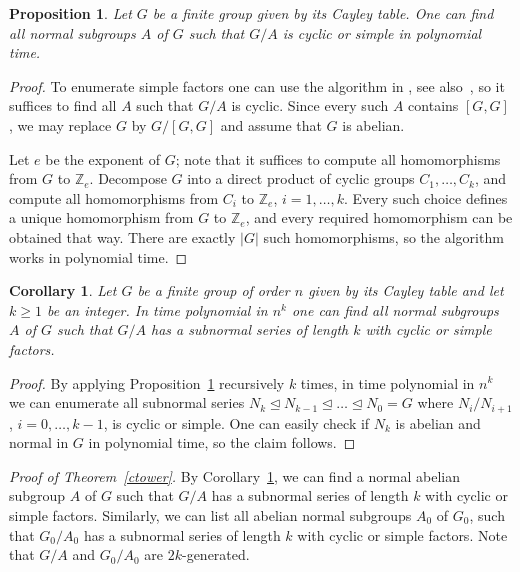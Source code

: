 \documentclass{article}
\newtheorem{proposition}[theorem]{Proposition}
\newtheorem{corollary}[theorem]{Corollary}
\begin{document}
\begin{proposition}\label{findcf}
	Let \( G \) be a finite group given by its Cayley table.
	One can find all normal subgroups \( A \) of \( G \) such that \( G/A \) is cyclic or simple in polynomial time.
\end{proposition}
\begin{proof}
	To enumerate simple factors one can use the algorithm in \cite[Lemma~7.4]{babainc},
	see also~\cite[Section~3.1~(o) and (p)]{seress}, so it suffices to find all \( A \)
	such that \( G/A \) is cyclic. Since every such \( A \) contains \( [G, G] \), we may replace \( G \) by \( G/[G, G] \) and assume that \( G \) is abelian.

	Let \( e \) be the exponent of \( G \); note that it suffices to compute all homomorphisms from \( G \) to \( \mathbb{Z}_e \).
	Decompose \( G \) into a direct product of cyclic groups \( C_1, \dots, C_k \), and compute all homomorphisms
	from \( C_i \) to \( \mathbb{Z}_e \), \( i = 1, \dots, k \). Every such choice defines a unique homomorphism from \( G \) to \( \mathbb{Z}_e \),
	and every required homomorphism can be obtained that way.
	There are exactly \( |G| \) such homomorphisms, so the algorithm works in polynomial time.
\end{proof}
\begin{corollary}\label{findall}
	Let \( G \) be a finite group of order \( n \) given by its Cayley table and let \( k \geq 1 \) be an integer.
	In time polynomial in \( n^k \) one can find all normal subgroups \( A \) of \( G \) such that \( G/A \) has a subnormal series of length \( k \) with
	cyclic or simple factors.
\end{corollary}
\begin{proof}
	By applying Proposition~\ref{findcf} recursively \( k \) times, in time polynomial in \( n^k \)
	we can enumerate all subnormal series \( N_k \unlhd N_{k-1} \unlhd \dots \unlhd N_0 = G \) where \( N_i/N_{i+1} \), \( i = 0, \dots, k-1 \), is cyclic or simple. 
	One can easily check if \( N_k \) is abelian and normal in \( G \) in polynomial time, so the claim follows.
\end{proof}

\noindent
\emph{Proof of Theorem~\ref{ctower}.}
By Corollary~\ref{findall}, we can find a normal abelian subgroup \( A \) of \( G \) such that
\( G/A \) has a subnormal series of length \( k \) with cyclic or simple factors. Similarly, we can list all abelian normal subgroups \( A_0 \)
of \( G_0 \), such that \( G_0/A_0 \) has a subnormal series of length \( k \) with cyclic or simple factors.
Note that \( G/A \) and \( G_0/A_0 \) are \( 2k \)-generated.
\end{document}
